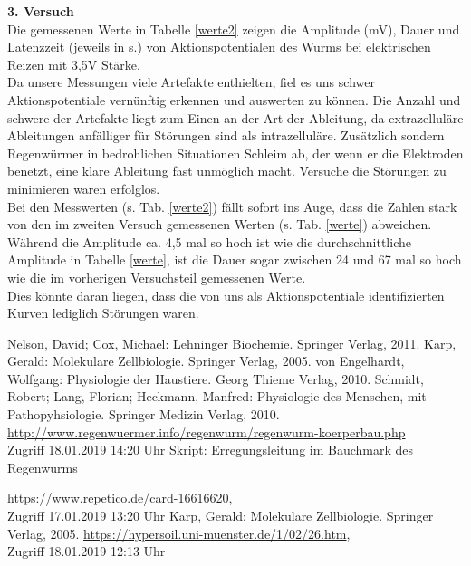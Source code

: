 \documentclass[11pt]{article}
\begin{document}
\textbf{3. Versuch}\\
Die gemessenen Werte in Tabelle \ref{werte2} zeigen die Amplitude (mV), Dauer und Latenzzeit (jeweils in s.) von Aktionspotentialen des Wurms bei elektrischen Reizen mit 3,5V Stärke.\\
Da unsere Messungen viele Artefakte enthielten, fiel es uns schwer Aktionspotentiale vernünftig erkennen und auswerten zu können. Die Anzahl und schwere der Artefakte liegt zum Einen an der Art der Ableitung, da extrazelluläre Ableitungen anfälliger für Störungen sind als intrazelluläre. Zusätzlich sondern Regenwürmer in bedrohlichen Situationen Schleim ab, der wenn er die Elektroden benetzt, eine klare Ableitung fast unmöglich macht. Versuche die Störungen zu minimieren waren erfolglos.\\
Bei den Messwerten (s. Tab. \ref{werte2}) fällt sofort ins Auge, dass die Zahlen stark von den im zweiten Versuch gemessenen Werten (s. Tab. \ref{werte}) abweichen. Während die Amplitude ca. 4,5 mal so hoch ist wie die durchschnittliche Amplitude in Tabelle \ref{werte}, ist die Dauer sogar zwischen 24 und 67 mal so hoch wie die im vorherigen Versuchsteil gemessenen Werte.\\
Dies könnte daran liegen, dass die von uns als Aktionspotentiale identifizierten Kurven lediglich Störungen waren.\\




\begin{thebibliography}{999}
 Nelson, David; Cox, Michael: Lehninger Biochemie. Springer Verlag, 2011.
 Karp, Gerald: Molekulare Zellbiologie. Springer Verlag, 2005.
 von Engelhardt, Wolfgang: Physiologie der Haustiere. Georg Thieme Verlag, 2010. 
 Schmidt, Robert; Lang, Florian; Heckmann, Manfred: Physiologie des Menschen, mit Pathopyhsiologie. Springer Medizin Verlag, 2010. 
 \url{http://www.regenwuermer.info/regenwurm/regenwurm-koerperbau.php} \\Zugriff 18.01.2019 14:20 Uhr
 Skript: Erregungsleitung im Bauchmark des Regenwurms

 \url{https://www.repetico.de/card-16616620}, \\Zugriff 17.01.2019 13:20 Uhr
 Karp, Gerald: Molekulare Zellbiologie. Springer Verlag, 2005.
 \url{https://hypersoil.uni-muenster.de/1/02/26.htm}, \\Zugriff 18.01.2019 12:13 Uhr
\end{thebibliography}
\end{document}
